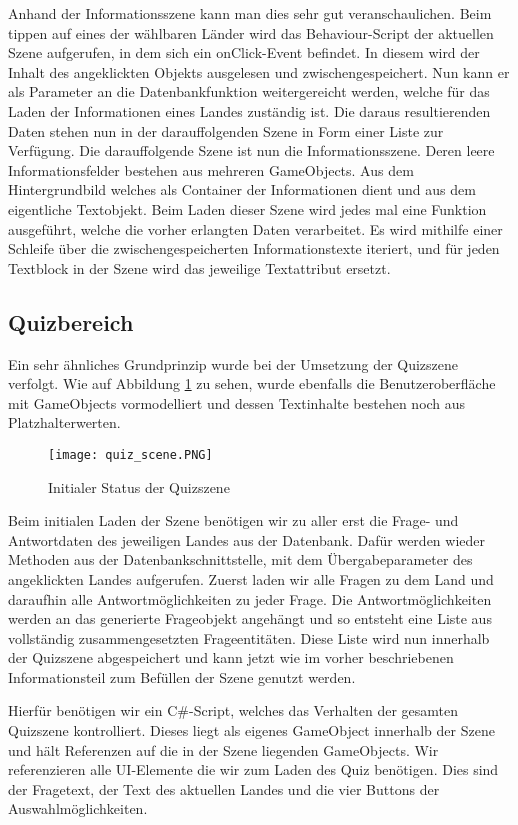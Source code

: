 Anhand der Informationsszene kann man dies sehr gut veranschaulichen. 
Beim tippen auf eines der wählbaren Länder wird das Behaviour-Script der aktuellen Szene aufgerufen, in dem sich ein onClick-Event befindet. 
In diesem wird der Inhalt des angeklickten Objekts ausgelesen und zwischengespeichert. Nun kann er als Parameter an die Datenbankfunktion weitergereicht werden, welche für das Laden der Informationen eines Landes zuständig ist. 
Die daraus resultierenden Daten stehen nun in der darauffolgenden Szene in Form einer Liste zur Verfügung.
Die darauffolgende Szene ist nun die Informationsszene. Deren leere Informationsfelder bestehen aus mehreren GameObjects.
Aus dem Hintergrundbild welches als Container der Informationen dient und aus dem eigentliche Textobjekt.
Beim Laden dieser Szene wird jedes mal eine Funktion ausgeführt, welche die vorher erlangten Daten verarbeitet.
Es wird mithilfe einer Schleife über die zwischengespeicherten Informationstexte iteriert, und für jeden Textblock in der Szene wird das jeweilige Textattribut ersetzt.

\subsection{Quizbereich}
Ein sehr ähnliches Grundprinzip wurde bei der Umsetzung der Quizszene verfolgt.
Wie auf Abbildung \ref{fig:quizscene} zu sehen, wurde ebenfalls die Benutzeroberfläche mit GameObjects vormodelliert und dessen Textinhalte bestehen noch aus Platzhalterwerten.

\begin{figure} [h]
\centering
\texttt{[image: quiz\_scene.PNG]}
\caption{Initialer Status der Quizszene}
\label{fig:quizscene}
\end{figure}

Beim initialen Laden der Szene benötigen wir zu aller erst die Frage- und Antwortdaten des jeweiligen Landes aus der Datenbank.
Dafür werden wieder Methoden aus der Datenbankschnittstelle, mit dem Übergabeparameter des angeklickten Landes aufgerufen. 
Zuerst laden wir alle Fragen zu dem Land und daraufhin alle Antwortmöglichkeiten zu jeder Frage. 
Die Antwortmöglichkeiten werden an das generierte Frageobjekt angehängt und so entsteht eine Liste aus vollständig zusammengesetzten Frageentitäten.
Diese Liste wird nun innerhalb der Quizszene abgespeichert und kann jetzt wie im vorher beschriebenen Informationsteil zum Befüllen der Szene genutzt werden.

Hierfür benötigen wir ein C\#-Script, welches das Verhalten der gesamten Quizszene kontrolliert.
Dieses liegt als eigenes GameObject innerhalb der Szene und hält Referenzen auf die in der Szene liegenden GameObjects.
Wir referenzieren alle UI-Elemente die wir zum Laden des Quiz benötigen.
Dies sind der Fragetext, der Text des aktuellen Landes und die vier Buttons der Auswahlmöglichkeiten.

